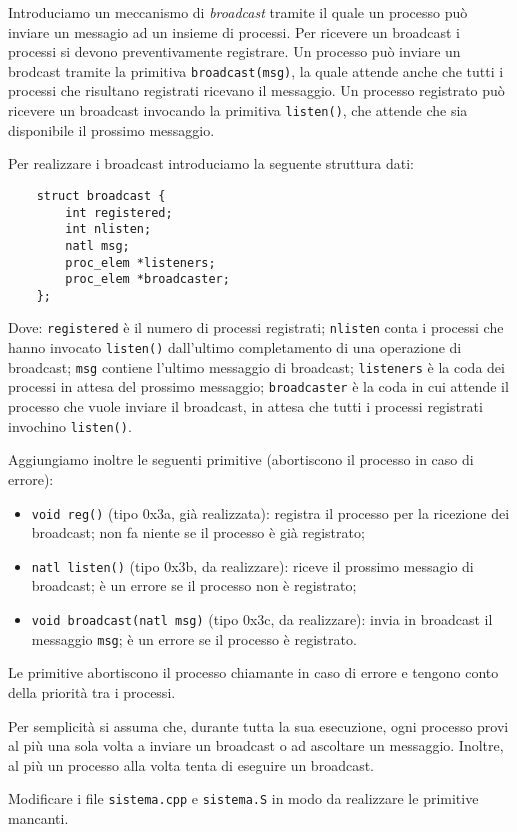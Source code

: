 Introduciamo un meccanismo di {\em broadcast} tramite il quale
un processo pu\`o inviare un messagio ad un insieme di processi.
Per ricevere un broadcast i processi si devono preventivamente
registrare. Un processo pu\`o inviare un brodcast tramite
la primitiva \verb|broadcast(msg)|, la quale attende anche che tutti
i processi che risultano registrati ricevano il messaggio.
Un processo registrato pu\`o ricevere un broadcast invocando
la primitiva \verb|listen()|, che attende che sia disponibile
il prossimo messaggio.

Per realizzare i broadcast introduciamo la seguente struttura dati:
\begin{verbatim}
    struct broadcast {
        int registered;
        int nlisten;
        natl msg;
        proc_elem *listeners;
        proc_elem *broadcaster;
    };
\end{verbatim}
Dove: \verb|registered| \`e il numero di processi registrati;
\verb|nlisten| conta i processi che hanno invocato \verb|listen()| dall'ultimo completamento di una operazione
di broadcast; \verb|msg| contiene l'ultimo messaggio di broadcast; \verb|listeners| \`e la coda
dei processi in attesa del prossimo messaggio; \verb|broadcaster| \`e la coda in cui attende il processo
che vuole inviare il broadcast, in attesa che tutti i processi registrati invochino \verb|listen()|.

Aggiungiamo inoltre le seguenti primitive (abortiscono il processo in caso di errore):
\begin{itemize}
   \item \verb|void reg()| (tipo 0x3a, gi\`a realizzata):
   	registra il processo per la ricezione dei broadcast; non fa niente se il processo \`e gi\`a registrato;
   \item \verb|natl listen()| (tipo 0x3b, da realizzare):
   	riceve il prossimo messagio di broadcast; \`e un errore se il processo non \`e registrato;
   \item \verb|void broadcast(natl msg)| (tipo 0x3c, da realizzare): 
   	invia in broadcast il messaggio \verb|msg|; \`e un errore se il processo \`e registrato.
\end{itemize}

Le primitive abortiscono il processo chiamante in caso di errore e tengono conto della priorit\`a tra i processi.

Per semplicit\`a si assuma che, durante tutta la sua esecuzione, ogni processo provi al pi\`u una sola volta a inviare un broadcast o ad ascoltare un messaggio.
Inoltre, al pi\`u un processo alla volta tenta di eseguire un broadcast.

Modificare i file \verb|sistema.cpp| e \verb|sistema.S| in modo da realizzare le primitive mancanti.
